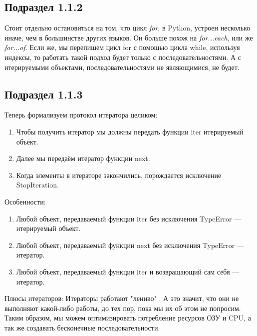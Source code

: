 \documentclass[14pt]{extreport}
\begin{document}
\subsection{Подраздел 1.1.2}  
\sloppy

Стоит отдельно остановиться на том, что цикл \textit{for}, в Python, устроен несколько иначе, чем в большинстве других языков. Он больше похож на \textit{for...each}, или же \textit{for...of}.
Если же, мы перепишем цикл for с помощью цикла while, используя индексы, то работать такой подход будет только с последовательностями. А с итерируемыми объектами, последовательностями не являющимися, не будет.

\subsection{Подраздел 1.1.3}  
\sloppy

Теперь формализуем протокол итератора целиком:

\begin{enumerate}
\item Чтобы получить итератор мы должны передать функции iter итерируемый объект.
\item Далее мы передаём итератор функции next.
\item Когда элементы в итераторе закончились, порождается исключение StopIteration.
\end{enumerate} 

Особенности:
\begin{enumerate}
\item Любой объект, передаваемый функции iter без исключения TypeError — итерируемый объект.
\item Любой объект, передаваемый функции next без исключения TypeError — итератор.
\item Любой объект, передаваемый функции iter и возвращающий сам себя — итератор.
\end{enumerate}

Плюсы итераторов:
Итераторы работают "лениво" . А это значит, что они не выполняют какой-либо работы, до тех пор, пока мы их об этом не попросим. Таким образом, мы можем оптимизировать потребление ресурсов ОЗУ и CPU, а так же создавать бесконечные последовательности.
\end{document}
